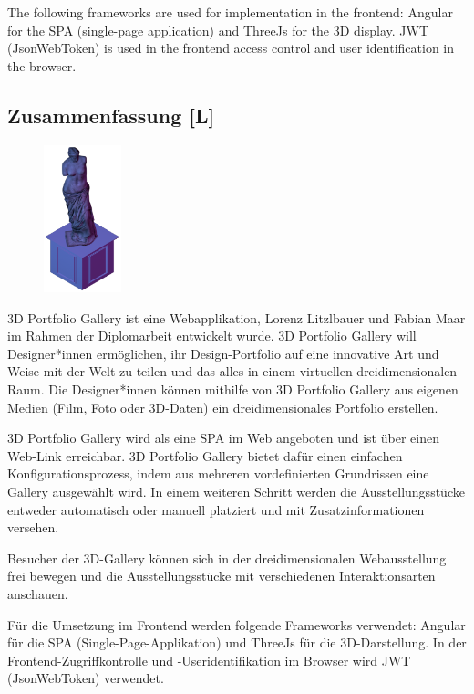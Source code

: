 The following frameworks are used for implementation in the frontend: Angular for the SPA (single-page application) and ThreeJs for the 3D display. JWT (JsonWebToken) is used in the frontend access control and user identification in the browser.
\newpage
\begin{spacing}{1}
    \chapter*{Zusammenfassung [L]}
\end{spacing}
\begin{figure}
    \begin{center}
      \includegraphics[width=0.2\textwidth]{pics/statue.png}
    \end{center}
\end{figure}
3D Portfolio Gallery ist eine Webapplikation, Lorenz Litzlbauer und Fabian Maar im Rahmen der Diplomarbeit entwickelt wurde. 3D Portfolio Gallery will Designer*innen ermöglichen, ihr Design-Portfolio auf eine innovative Art und Weise mit der Welt zu teilen und das alles in einem virtuellen dreidimensionalen Raum. Die Designer*innen können mithilfe von 3D Portfolio Gallery aus eigenen Medien (Film, Foto oder 3D-Daten) ein dreidimensionales Portfolio erstellen.

3D Portfolio Gallery wird als eine SPA im Web angeboten und ist über einen Web-Link erreichbar. 3D Portfolio Gallery bietet dafür einen einfachen Konfigurationsprozess, indem aus mehreren vordefinierten Grundrissen eine Gallery ausgewählt wird. In einem weiteren Schritt werden die Ausstellungsstücke entweder automatisch oder manuell platziert und mit Zusatzinformationen versehen.

Besucher der 3D-Gallery können sich in der dreidimensionalen Webausstellung frei bewegen und die Ausstellungsstücke mit verschiedenen Interaktionsarten anschauen.

Für die Umsetzung im Frontend werden folgende Frameworks verwendet: Angular für die SPA (Single-Page-Applikation) und ThreeJs für die 3D-Darstellung. In der Frontend-Zugriffkontrolle und -Useridentifikation im Browser wird JWT (JsonWebToken) verwendet.
